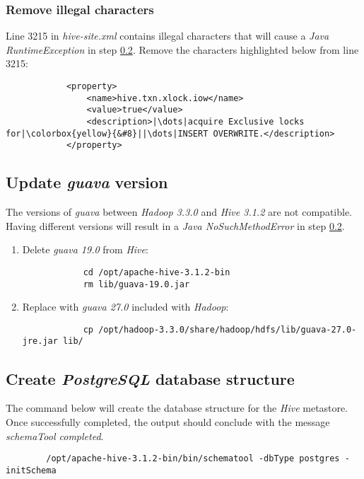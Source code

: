 \documentclass{article}
\begin{document}
        \subsubsection{Remove illegal characters}
        Line 3215 in \emph{hive-site.xml} contains illegal characters that will cause a
        \emph{Java RuntimeException} in step \ref{subsec:schematool}. Remove the characters highlighted below from line 3215:
        \begin{verbatim}
            <property>
                <name>hive.txn.xlock.iow</name>
                <value>true</value>
                <description>|\dots|acquire Exclusive locks for|\colorbox{yellow}{&#8}||\dots|INSERT OVERWRITE.</description>
            </property>
        \end{verbatim}

    \subsection{Update \emph{guava} version}
    The versions of \emph{guava} between \emph{Hadoop 3.3.0} and \emph{Hive 3.1.2} are not compatible.
    Having different versions will result in a \emph{Java NoSuchMethodError} in step \ref{subsec:schematool}.
    \begin{enumerate}
        \item Delete \emph{guava 19.0} from \emph{Hive}:
        \begin{verbatim}
            cd /opt/apache-hive-3.1.2-bin
            rm lib/guava-19.0.jar
        \end{verbatim}

        \item Replace with \emph{guava 27.0} included with \emph{Hadoop}:
        \begin{verbatim}
            cp /opt/hadoop-3.3.0/share/hadoop/hdfs/lib/guava-27.0-jre.jar lib/
        \end{verbatim}
    \end{enumerate}

    \subsection{Create \emph{PostgreSQL} database structure}
    \label{subsec:schematool}
    The command below will create the database structure for the \emph{Hive} metastore. Once
    successfully completed, the output should conclude with the message \emph{schemaTool completed}.
    \begin{verbatim}
        /opt/apache-hive-3.1.2-bin/bin/schematool -dbType postgres -initSchema
    \end{verbatim}
\end{document}
